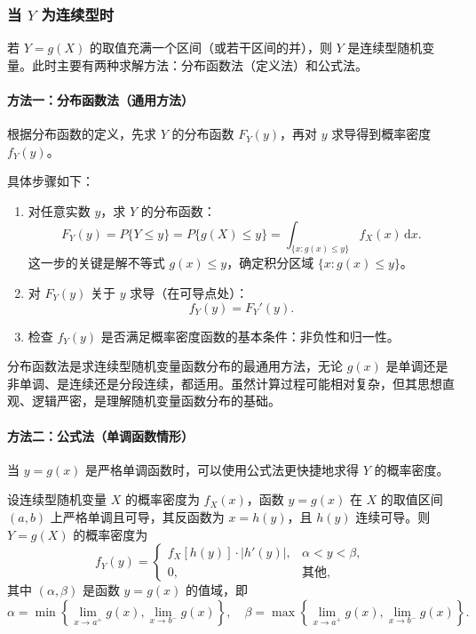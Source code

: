 ﻿\documentclass[lang=cn,11pt]{elegantbook}
\begin{document}
\subsubsection{当 \texorpdfstring{$Y$}{Y} 为连续型时} 

若 $Y = g(X)$ 的取值充满一个区间（或若干区间的并），则 $Y$ 是连续型随机变量。此时主要有两种求解方法：分布函数法（定义法）和公式法。

\paragraph{方法一：分布函数法（通用方法）} \label{par:distribution-function-method}
根据分布函数的定义，先求 $Y$ 的分布函数 $F_Y(y)$，再对 $y$ 求导得到概率密度 $f_Y(y)$。

具体步骤如下：
\begin{enumerate}
    \item 对任意实数 $y$，求 $Y$ 的分布函数：
    \[
    F_Y(y) = P\{Y \le y\} = P\{g(X) \le y\} = \int_{\{x: g(x) \le y\}} f_X(x) \,\mathrm{d}x.
    \]
    这一步的关键是解不等式 $g(x) \le y$，确定积分区域 $\{x: g(x) \le y\}$。
    
    \item 对 $F_Y(y)$ 关于 $y$ 求导（在可导点处）：
    \[
    f_Y(y) = F_Y'(y).
    \]
    
    \item 检查 $f_Y(y)$ 是否满足概率密度函数的基本条件：非负性和归一性。
\end{enumerate}

\begin{note}
分布函数法是求连续型随机变量函数分布的最通用方法，无论 $g(x)$ 是单调还是非单调、是连续还是分段连续，都适用。虽然计算过程可能相对复杂，但其思想直观、逻辑严密，是理解随机变量函数分布的基础。
\end{note}

\paragraph{方法二：公式法（单调函数情形）} \label{par:formula-method}
当 $y = g(x)$ 是严格单调函数时，可以使用公式法更快捷地求得 $Y$ 的概率密度。

\begin{theorem}[随机变量函数的密度公式] \label{thm:function-density-formula}
设连续型随机变量 $X$ 的概率密度为 $f_X(x)$，函数 $y = g(x)$ 在 $X$ 的取值区间 $(a,b)$ 上严格单调且可导，其反函数为 $x = h(y)$，且 $h(y)$ 连续可导。则 $Y = g(X)$ 的概率密度为
\[
f_Y(y) = \begin{cases}
f_X[h(y)] \cdot |h'(y)|, & \alpha < y < \beta, \\
0, & \text{其他},
\end{cases}
\]
其中 $(\alpha, \beta)$ 是函数 $y = g(x)$ 的值域，即
\[
\alpha = \min\left\{\lim_{x \to a^+} g(x), \lim_{x \to b^-} g(x)\right\}, \quad \beta = \max\left\{\lim_{x \to a^+} g(x), \lim_{x \to b^-} g(x)\right\}.
\]
\end{theorem}
\end{document}
